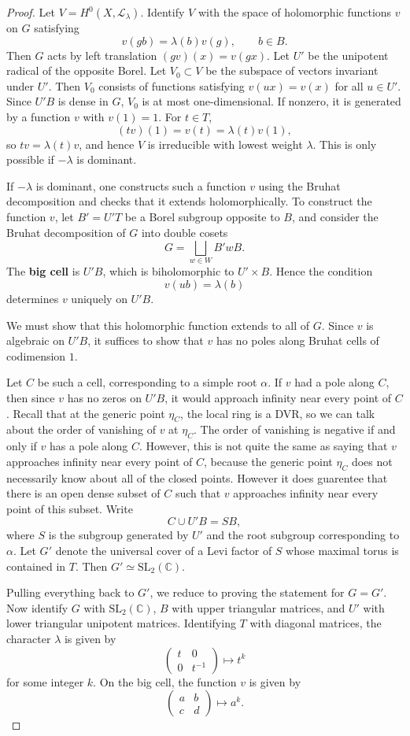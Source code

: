 \documentclass[12pt]{article}
\begin{document}
\begin{proof}
Let $V = H^0(X,\mathcal L_\lambda)$. Identify $V$ with the space of holomorphic functions $v$ on $G$ satisfying
\[
v(gb) = \lambda(b)v(g), \qquad b \in B.
\]
Then $G$ acts by left translation $(gv)(x)=v(gx)$. Let $U'$ be the unipotent radical of the opposite Borel. Let $V_0 \subset V$ be the subspace of vectors invariant under $U'$. Then $V_0$ consists of functions satisfying $v(ux)=v(x)$ for all $u \in U'$. Since $U'B$ is dense in $G$, $V_0$ is at most one-dimensional. If nonzero, it is generated by a function $v$ with $v(1)=1$. For $t \in T$,
\[
(tv)(1) = v(t) = \lambda(t)v(1),
\]
so $tv = \lambda(t)v$, and hence $V$ is irreducible with lowest weight $\lambda$. This is only possible if $-\lambda$ is dominant. 

If $-\lambda$ is dominant, one constructs such a function $v$ using the Bruhat decomposition and checks that it extends holomorphically.
To construct the function $v$, let $B' = U'T$ be a Borel subgroup opposite to $B$, and consider the Bruhat decomposition of $G$ into double cosets
\[
G = \bigsqcup_{w \in W} B' w B.
\]
The \textbf{big cell} is $U'B$, which is biholomorphic to $U' \times B$. Hence the condition
\[
v(ub) = \lambda(b)
\]
determines $v$ uniquely on $U'B$.

We must show that this holomorphic function extends to all of $G$. Since $v$ is algebraic on $U'B$, it suffices to show that $v$ has no poles along Bruhat cells of codimension $1$.

Let $C$ be such a cell, corresponding to a simple root $\alpha$. If $v$ had a pole along $C$, then since $v$ has no zeros on $U'B$, it would approach infinity near every point of $C$. Recall that at the generic point $\eta_C$, the local ring is a DVR, so we can talk about the order of vanishing of $v$ at $\eta_C$. The order of vanishing is negative if and only if $v$ has a pole along $C$. However, this is not quite the same as saying that $v$ approaches infinity near every point of $C$, because the generic point $\eta_C$ does not necessarily know about all of the closed points. However it does guarentee that there is an open dense subset of $C$ such that $v$ approaches infinity near every point of this subset.
Write
\[
C \cup U'B = SB,
\]
where $S$ is the subgroup generated by $U'$ and the root subgroup corresponding to $\alpha$. Let $G'$ denote the universal cover of a Levi factor of $S$ whose maximal torus is contained in $T$. Then $G' \simeq \mathrm{SL}_2(\mathbb{C})$.

Pulling everything back to $G'$, we reduce to proving the statement for $G = G'$. Now identify $G$ with $\mathrm{SL}_2(\mathbb{C})$, $B$ with upper triangular matrices, and $U'$ with lower triangular unipotent matrices. Identifying $T$ with diagonal matrices, the character $\lambda$ is given by
\[
\begin{pmatrix}
t & 0 \\
0 & t^{-1}
\end{pmatrix}
\mapsto t^k
\]
for some integer $k$. On the big cell, the function $v$ is given by
\[
\begin{pmatrix}
a & b \\
c & d
\end{pmatrix}
\mapsto a^k.
\]


\end{proof}
\end{document}
